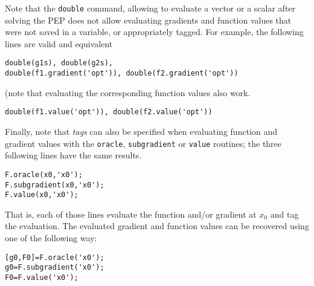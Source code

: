 \documentclass[11pt,a4paper]{article}
\begin{document}
Note that the \verb?double? command, allowing to evaluate a vector or a scalar after solving the PEP does not allow evaluating gradients and function values that were not saved in a variable, or appropriately tagged. For example, the following lines are valid and equivalent\\[-1cm]
\begin{lstlisting}
double(g1s), double(g2s),
double(f1.gradient('opt')), double(f2.gradient('opt'))
\end{lstlisting}
(note that evaluating the corresponding function values also work.\\[-1cm]
\begin{lstlisting}
double(f1.value('opt')), double(f2.value('opt'))
\end{lstlisting}
Finally, note that \emph{tags} can also be specified when evaluating function and gradient values with the \verb?oracle?, \verb?subgradient? or \verb?value? routines; the three following lines have the same results.\\[-1cm]
\begin{lstlisting}
F.oracle(x0,'x0');
F.subgradient(x0,'x0');
F.value(x0,'x0');
\end{lstlisting}
That is, each of those lines evaluate the function and/or gradient at $x_0$ and tag the evaluation. The evaluated gradient and function values can be recovered using one of the  following way:\\[-1cm]
\begin{lstlisting}
[g0,F0]=F.oracle('x0');
g0=F.subgradient('x0');
F0=F.value('x0');
\end{lstlisting}
\clearpage
\end{document}
